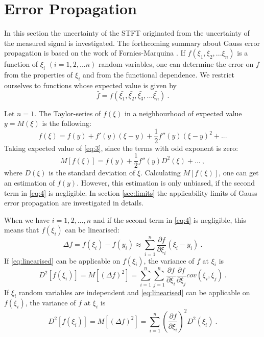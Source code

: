 \documentclass[a4paper,12pt,oneside]{article}
\begin{document}
\section{Error Propagation}

In this section the uncertainty of the STFT originated from the uncertainty of the measured signal is investigated. The forthcoming summary about Gauss error propagation is based on the work of Fornies-Marquina \cite{fornies1997error}. If $f(\xi_1, \xi_2, ... \xi_n)$ is a function of $\xi_i$ $(i = 1,2, ... n)$ random variables, one can determine the error on $f$ from the properties of $\xi_i$ and from the functional dependence. We restrict ourselves to functions whose expected value is given by
\begin{equation}\label{eq:restriction1}
  \bar{f} = f(\bar{\xi_1}, \bar{\xi_2}, \bar{\xi_3}, ... \bar{\xi_n}) \ .
\end{equation}

Let $n = 1$. The Taylor-series of $f(\xi)$ in a neighbourhood of expected value $y = M(\xi)$ is the following:
\begin{equation}\label{eq:3}
  f(\xi) = f(y) + f'(y)(\xi-y) + \frac{1}{2}f''(y)(\xi-y)^2 + ...
\end{equation}
Taking expected value of \eqref{eq:3}, since the terms with odd exponent is zero:
\begin{equation}\label{eq:4}
  M[f(\xi)] = f(y) + \frac{1}{2}f''(y)D^2(\xi) + ... \ ,
\end{equation}
where $D(\xi)$ is the standard deviation of $\xi$.
Calculating $M\left[f(\xi)\right]$, one can get an estimation of $f(y)$. However, this estimation is only unbiased, if the second term in \eqref{eq:4} is negligible. In section \ref{sec:limits} the applicability limits of Gauss error propagation are investigated in details.

When we have $i=1,2, ..., n$ and if the second term in \eqref{eq:4} is negligible, this means that $f(\xi_i)$ can be linearised:
\begin{equation}\label{eq:linearised}
   \Delta f = f(\xi_i) - f(y_i) \approx \sum\limits_{i=1}^n \frac{\partial f}{\partial \xi_i} (\xi_i - y_i) \ .
\end{equation}
If \eqref{eq:linearised} can be applicable on $f(\xi_i)$, the variance of $f$ at $\xi_i$ is
\begin{equation}\label{eq:variance}
  D^2 \left[ f(\xi_i) \right] = M \left[ (\Delta f)^2 \right] = \sum\limits_{i=1}^n \sum\limits_{j=1}^n \frac{\partial f}{\partial \xi_i} \frac{\partial f}{\partial \xi_j} cov(\xi_i, \xi_j) \ .
\end{equation}
If $\xi_i$ random variables are independent and \eqref{eq:linearised} can be applicable on $f(\xi_i)$, the variance of $f$ at $\xi_i$ is
\begin{equation}\label{eq:variance_ind}
  D^2 \left[ f(\xi_i) \right] = M \left[ (\Delta f)^2 \right] = \sum\limits_{i=1}^n \left( \frac{\partial f}{\partial \xi_i} \right)^2 D^2(\xi_i) \ .
\end{equation}
\end{document}
